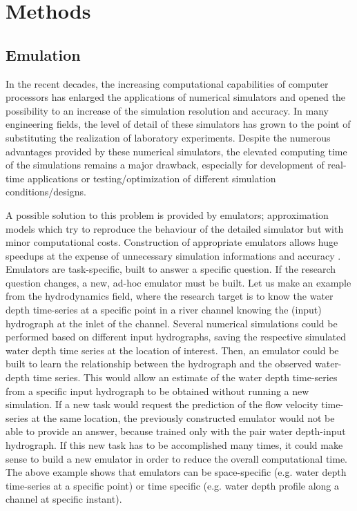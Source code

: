 \chapter{Methods}
\label{chp:methods}



\section{Emulation}\label{sec:emulation}


In the recent decades, the increasing computational capabilities of computer processors has enlarged the applications of numerical simulators and opened the possibility to an increase of the simulation resolution and accuracy.
In many engineering fields, the level of detail of these simulators has grown to the point of substituting the realization of laboratory experiments. 
Despite the numerous advantages provided by these numerical simulators, the elevated computing time of the simulations remains a major drawback, especially for development of real-time applications or testing/optimization of different simulation conditions/designs.
 
A possible solution to this problem is provided by emulators; approximation models which try to reproduce the behaviour of the detailed simulator but with minor computational costs. Construction of appropriate emulators allows huge speedups at the expense of unnecessary simulation informations and accuracy \autocite{carbajal_appraisal_2016}.\\

Emulators are task-specific, built to answer a specific question.
If the research question changes, a new, ad-hoc emulator must be built.
Let us make an example from the hydrodynamics field, where the research target is to know the water depth time-series at a specific point in a river channel knowing the (input) hydrograph at the inlet of the channel. 
Several numerical simulations could be performed based on different input hydrographs, saving the respective simulated water depth time series at the location of interest. Then, an emulator could be built to learn the relationship between the hydrograph and the observed water-depth time series. 
This would allow an estimate of the water depth time-series from a specific input
hydrograph to be obtained without running a new simulation.
If a new task would request the prediction of the flow velocity time-series at the same location, the previously constructed emulator would not be able to provide an answer, because trained only with the pair water depth-input hydrograph. If this new task has to be accomplished many times, it could make sense to build a new emulator in order to reduce the overall computational time.
The above example shows that emulators can be space-specific (e.g. water depth time-series at a specific point) or time specific (e.g. water depth profile along a channel at specific instant).\\

